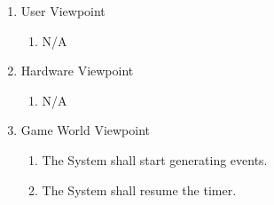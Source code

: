 \documentclass[]{article}
\begin{document}
\begin{enumerate}[{BE}1.]
	\begin{enumerate}[{VP4}.1]
		\item User Viewpoint
			\begin{enumerate}
				\item N/A
			\end{enumerate}
		\item Hardware Viewpoint
			\begin{enumerate}
				\item N/A
			\end{enumerate}
		\item Game World Viewpoint
			\begin{enumerate}
				\item The System shall start generating events.

				\item The System shall resume the timer.
			\end{enumerate}
			

\end{enumerate}
\end{enumerate}
\end{document}
